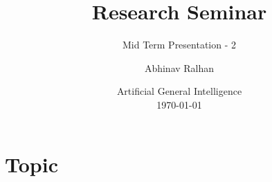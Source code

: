 \documentclass[
	11pt, %
]{beamer}
\title[Research Seminar]{Research Seminar} %
\subtitle{Mid Term Presentation - 2} %
\author[Abhinav Ralhan]{Abhinav Ralhan} %
\institute[UniKo]{University of Koblenz \\ \smallskip \textit{abhinavr8@uni-koblenz.de}} %
\date[\today]{Artificial General Intelligence \\ \today} %
\begin{document}

\begin{frame}
	\titlepage %
\end{frame}

\section{Topic} %
\end{document}
